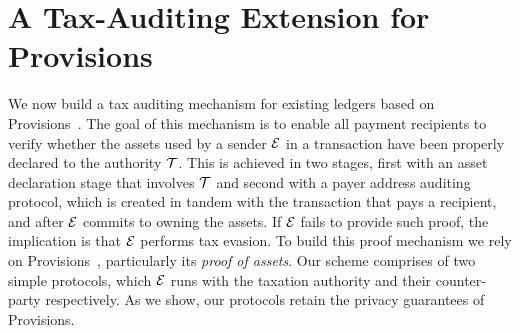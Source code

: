 \section{A Tax-Auditing Extension for Provisions}\label{sec:provisions-extension}

We now build a tax auditing mechanism for existing ledgers based on
Provisions~\cite{CCS:DBBCB15}. The goal of this mechanism is to enable all payment recipients to verify whether the assets used by a sender $\mathcal{E}$ in a transaction have been
properly declared to the authority $\mathcal{T}$. This is achieved in two stages, first with an asset declaration stage that involves $\mathcal{T}$ and second with a payer address auditing protocol, which is created
in tandem with the transaction that pays a recipient,
and after $\mathcal{E}$ commits to owning the assets. If $\mathcal{E}$ fails to provide such proof, the implication is that $\mathcal{E}$ performs tax evasion.
To build this proof mechanism we rely on Provisions~\cite{CCS:DBBCB15},
particularly its \emph{proof of assets}. Our scheme comprises of two simple
protocols, which $\mathcal{E}$ runs with the taxation authority and their
counter-party respectively. As we show, our protocols retain the privacy
guarantees of Provisions.

